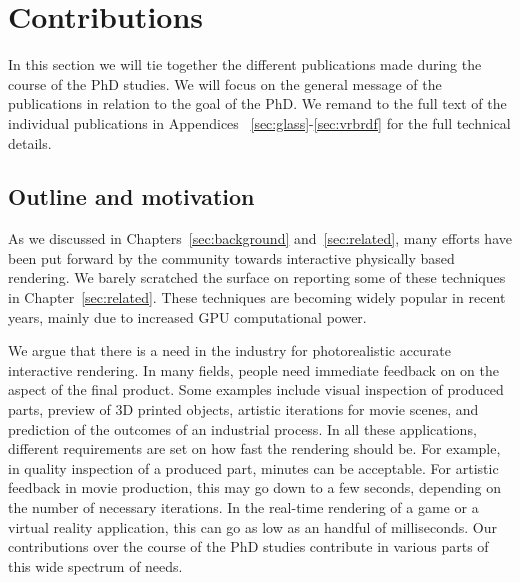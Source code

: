 \chapter{Contributions}
\label{sec:contributions}

In this section we will tie together the different publications made during the course of the PhD studies. We will focus on the general message of the publications in relation to the goal of the PhD. We remand to the full text of the individual publications in Appendices~ \ref{sec:glass}-\ref{sec:vrbrdf} for the full technical details.

\section{Outline and motivation}


As we discussed in Chapters~\ref{sec:background} and~\ref{sec:related}, many efforts have been put forward by the community towards interactive physically based rendering. We barely scratched the surface on reporting some of these techniques in Chapter~\ref{sec:related}. These techniques are becoming widely popular in recent years, mainly due to increased GPU computational power. 

We argue that there is a need in the industry for photorealistic accurate interactive rendering. In many fields, people need immediate feedback on on the aspect of the final product. Some examples include visual inspection of produced parts, preview of 3D printed objects, artistic iterations for movie scenes, and prediction of the outcomes of an industrial process. In all these applications, different requirements are set on how fast the rendering should be. For example, in quality inspection of a produced part, minutes can be acceptable. For artistic feedback in movie production, this may go down to a few seconds, depending on the number of necessary iterations. In  the real-time rendering of a game or a virtual reality application, this can go as low as an handful of milliseconds. Our contributions over the course of the PhD studies contribute in various parts of this wide spectrum of needs.


